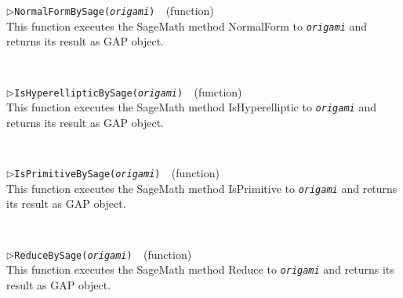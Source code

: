 \documentclass[a4paper,11pt]{report}
\begin{document}
{{{\begin{Verbatim}[commandchars=!@|,fontsize=\small,frame=single,label=Example]
\end{Verbatim}
 \noindent\textcolor{FuncColor}{$\triangleright$\enspace\texttt{NormalFormBySage({\mdseries\slshape origami})
\label{NormalFormBySage}
}\hfill{\scriptsize (function)}}\\


 This function executes the SageMath method NormalForm to \mbox{\texttt{\mdseries\slshape origami}} and returns its result as \textsf{GAP} object. 
\begin{Verbatim}[commandchars=!@|,fontsize=\small,frame=single,label=Example]
  
\end{Verbatim}
 \noindent\textcolor{FuncColor}{$\triangleright$\enspace\texttt{IsHyperellipticBySage({\mdseries\slshape origami})
\label{IsHyperellipticBySage}
}\hfill{\scriptsize (function)}}\\


 This function executes the SageMath method IsHyperelliptic to \mbox{\texttt{\mdseries\slshape origami}} and returns its result as \textsf{GAP} object. 
\begin{Verbatim}[commandchars=!@|,fontsize=\small,frame=single,label=Example]
  
\end{Verbatim}
 \noindent\textcolor{FuncColor}{$\triangleright$\enspace\texttt{IsPrimitiveBySage({\mdseries\slshape origami})
\label{IsPrimitiveBySage}
}\hfill{\scriptsize (function)}}\\


 This function executes the SageMath method IsPrimitive to \mbox{\texttt{\mdseries\slshape origami}} and returns its result as \textsf{GAP} object. 
\begin{Verbatim}[commandchars=!@|,fontsize=\small,frame=single,label=Example]
  
\end{Verbatim}
 \noindent\textcolor{FuncColor}{$\triangleright$\enspace\texttt{ReduceBySage({\mdseries\slshape origami})
\label{ReduceBySage}
}\hfill{\scriptsize (function)}}\\


 This function executes the SageMath method Reduce to \mbox{\texttt{\mdseries\slshape origami}} and returns its result as \textsf{GAP} object. 
\begin{Verbatim}[commandchars=!@|,fontsize=\small,frame=single,label=Example]
  

\end{Verbatim}}}}
\end{document}
